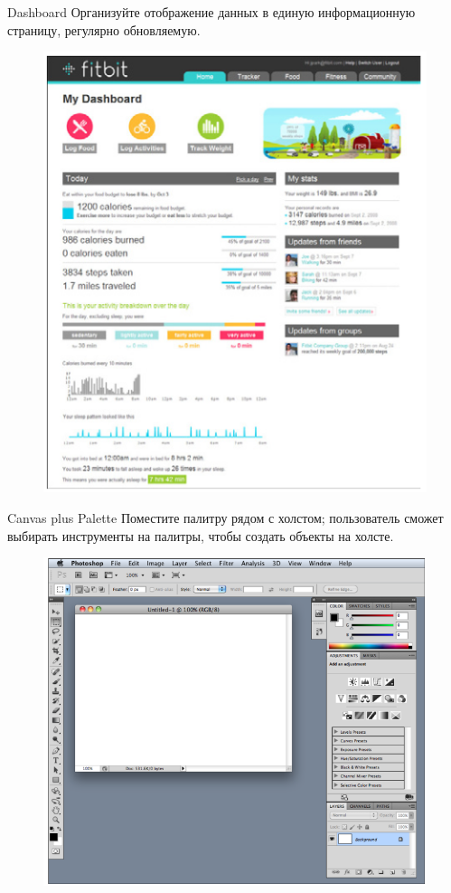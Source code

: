 \documentclass{beamer}
\begin{document}
\begin{frame}[t]{Dashboard}
	Организуйте отображение данных в единую информационную страницу, регулярно обновляемую.
	\begin{figure}[h]
		\centering
		\includegraphics[scale=0.5]{images/lec07-pic08.png}
	\end{figure}
\end{frame} 

\begin{frame}[t]{Canvas plus Palette}
	Поместите палитру рядом с холстом; пользователь сможет выбирать инструменты на палитры, чтобы создать объекты на холсте.
	\begin{figure}[h]
		\centering
		\includegraphics[scale=0.5]{images/lec07-pic09.png}
	\end{figure}
\end{frame} 
\end{document}
